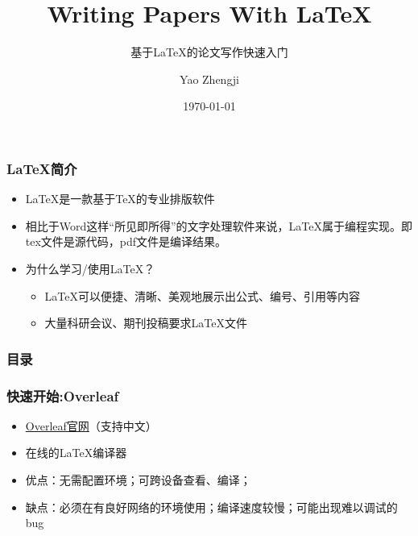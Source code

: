 \documentclass{beamer}
\title{Writing Papers With \LaTeX{}}
\subtitle{基于\LaTeX{}的论文写作快速入门}
\author{Yao Zhengji}
\date{\today}
\institute{NEU}
\begin{document}
\frame{\maketitle}

\begin{frame} 
    \frametitle{\LaTeX{}简介} 
    \begin{itemize} 
        \item \LaTeX{}是一款基于\TeX{}的专业排版软件
        \item 相比于Word这样“所见即所得”的文字处理软件来说，\LaTeX{}属于编程实现。即tex文件是源代码，pdf文件是编译结果。
        \item 为什么学习/使用\LaTeX{}？
        \begin{itemize}
            \item \LaTeX{}可以便捷、清晰、美观地展示出公式、编号、引用等内容
            \item 大量科研会议、期刊投稿要求\LaTeX{}文件
        \end{itemize}
    \end{itemize} 
\end{frame}

\begin{frame}
    \frametitle{目录}
    \tableofcontents
\end{frame}

\begin{frame} 
    \frametitle{快速开始:Overleaf} 
    \begin{itemize} 
        \item \href{https://cn.overleaf.com/}{Overleaf官网}（支持中文）
        \item 在线的\LaTeX{}编译器
        \item 优点：无需配置环境；可跨设备查看、编译；
        \item 缺点：必须在有良好网络的环境使用；编译速度较慢；可能出现难以调试的bug
    \end{itemize} 
\end{frame}
\end{document}
